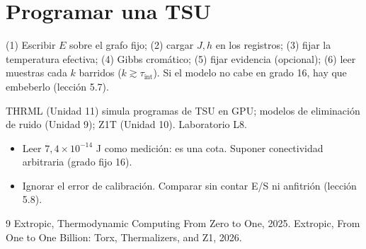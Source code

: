 \documentclass[11pt,a4paper]{article}
\begin{document}
\section{Programar una TSU}
(1) Escribir $E$ sobre el grafo fijo; (2) cargar $J,h$ en los registros; (3) fijar la temperatura efectiva; (4) Gibbs cromático; (5) fijar evidencia
(opcional); (6) leer muestras cada $k$ barridos ($k\gtrsim\tau_{\text{int}}$). Si el modelo no cabe en grado 16, hay que embeberlo (lección 5.7).

\begin{aplicacion}
THRML (Unidad 11) simula programas de TSU en GPU; modelos de eliminación de ruido (Unidad 9); Z1T (Unidad 10). Laboratorio L8.
\end{aplicacion}

\begin{error}
\begin{itemize}[nosep]
\item Leer $7{,}4\times10^{-14}$ J como medición: es una cota. \quad Suponer conectividad arbitraria (grado fijo 16).
\item Ignorar el error de calibración. \quad Comparar sin contar E/S ni anfitrión (lección 5.8).
\end{itemize}
\end{error}

\begin{thebibliography}{9}\small
{} Extropic, Thermodynamic Computing From Zero to One, 2025.
 Extropic, From One to One Billion: Torx, Thermalizers, and Z1, 2026.
\end{thebibliography}
\end{document}
